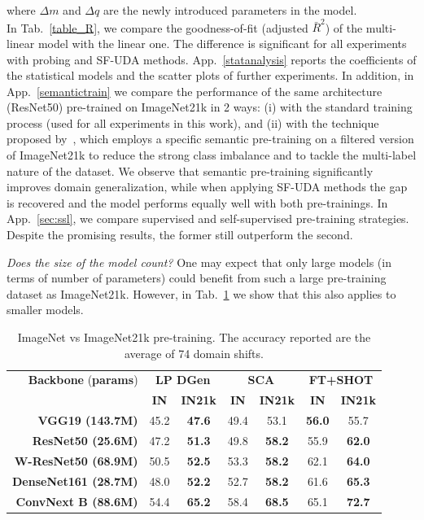 \documentclass{article}
\begin{document}
where $\Delta m$ and $\Delta q$ are the newly introduced parameters in the model.\\
In Tab.~\ref{table_R}, we compare the goodness-of-fit (adjusted $\bar{R}^2$) of the multi-linear model with the linear one.
The difference is significant for all experiments with probing  and SF-UDA methods.
App.~\ref{statanalysis} reports the coefficients of the statistical models and the scatter plots of further experiments.
In addition, in App.~\ref{semantictrain} we compare the performance of the same  architecture (ResNet50) pre-trained on ImageNet21k in 2 ways: (i) with the standard training process (used for all experiments in this work), and (ii) with the technique proposed by~\cite{ridnik2021imagenet}, which employs a specific semantic pre-training on a filtered version of ImageNet21k to reduce the strong class imbalance and to tackle the multi-label nature of the dataset. 
We observe that semantic pre-training significantly improves domain generalization, while when applying SF-UDA methods the gap is recovered and the model performs equally well with both pre-trainings. In App.~\ref{sec:ssl}, we 
compare supervised and self-supervised pre-training  strategies.
Despite the promising results, the former still outperform the second.

\textit{Does the size of the model count?} One may expect that only large models (in terms of number of parameters) could benefit from such a large pre-training dataset as ImageNet21k. 
However, in Tab.~\ref{in_vs_21k} we show that this also applies to smaller models.
\smallskip

\begin{table}[t]
\caption{ImageNet vs ImageNet21k pre-training. The accuracy reported are the average of 74 domain shifts.} 
\label{in_vs_21k}
\begin{center}
\footnotesize
\begin{tabular}{r|cc|cc|cc}

\toprule
\textbf{Backbone} (\textbf{params}) & \multicolumn{2}{c|}{\textbf{LP DGen}} & \multicolumn{2}{c|}{\textbf{SCA}} & \multicolumn{2}{c}{\textbf{FT+SHOT}} \\
& \textbf{IN} & \textbf{IN21k}& \textbf{IN} & \textbf{IN21k}& \textbf{IN} & \textbf{IN21k} \\
\textbf{VGG19 (143.7M)}  & 45.2 & \textbf{47.6} & 49.4 & 53.1 & \textbf{56.0} & 55.7\\
\textbf{ResNet50 (25.6M)} & 47.2 & \textbf{51.3} & 49.8 & \textbf{58.2} & 55.9 & \textbf{62.0} \\
\textbf{W-ResNet50 (68.9M)} & 50.5 & \textbf{52.5} & 53.3 & \textbf{58.2} & 62.1 & \textbf{64.0} \\
\textbf{DenseNet161 (28.7M)} & 48.0 & \textbf{52.2} & 52.7 & \textbf{58.2} & 61.6 & \textbf{65.3} \\
\textbf{ConvNext B (88.6M)} & 54.4 & \textbf{65.2} & 58.4 & \textbf{68.5} & 65.1 & \textbf{72.7} \\
\bottomrule

\end{tabular}
\end{center}

\vspace{-0.7cm}
\end{table}
\end{document}
